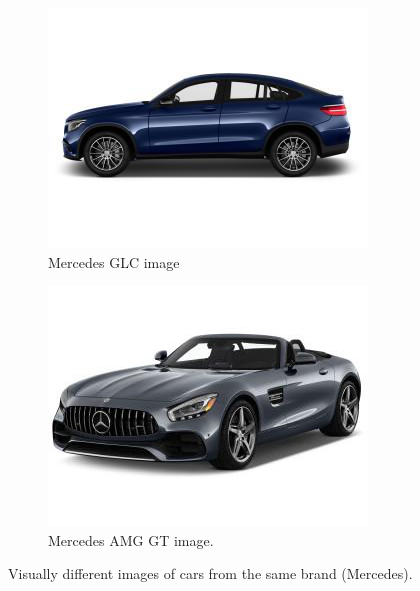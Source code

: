 \documentclass[conference]{IEEEtran}
\begin{document}
\begin{figure}[t]
    \centering
    \begin{subfigure}[b]{0.48\linewidth}        %
        \centering
        \includegraphics[width=0.96\linewidth]{Mercedes-Benz_GLC Class_2019_61_20_360_30_6_76_62_186_19_AWD_5_4_SUV_Rpc.jpg}
        \caption{Mercedes GLC image}
        \label{fig:mercglc}
    \end{subfigure}
    \begin{subfigure}[b]{0.48\linewidth}        %
        \centering
        \includegraphics[width=0.96\linewidth]{Mercedes-Benz_AMG GT_2019_99_19_420_30_6_76_57_199_19_AWD_4_4_4dr_snY.jpg}
        \caption{Mercedes AMG GT image.}
        \label{fig:merccoupe}
    \end{subfigure}
    \caption{Visually different images of cars from the same brand (Mercedes).}
    \label{fig:mercedes}
\end{figure}
\end{document}
